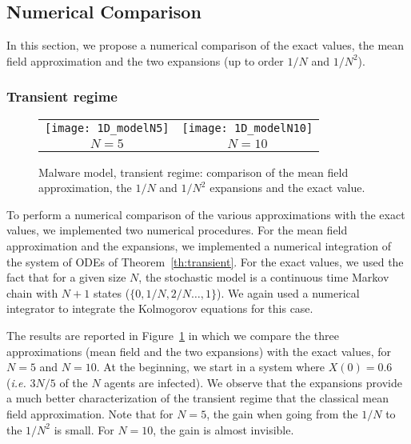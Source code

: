 \documentclass[sigconf]{acmart}
\begin{document}
\subsection{Numerical Comparison}

In this section, we propose a numerical comparison of the exact
values, the mean field approximation and the two expansions (up to
order $1/N$ and $1/N^2$).

\subsubsection{Transient regime}

\begin{figure}[t]
  \centering
  \begin{tabular}{@{}cc@{}}
    \texttt{[image: 1D\_modelN5]}
    &\texttt{[image: 1D\_modelN10]}
    \\
    $N=5$&$N=10$
  \end{tabular}
  
  \caption{Malware model, transient regime: comparison of the mean
    field approximation, the $1/N$ and $1/N^2$ expansions and the
    exact value.}
  \label{fig:SIS-transient1}
\end{figure}

To perform a numerical comparison of the various approximations with
the exact values, we implemented two numerical procedures. For the
mean field approximation and the expansions, we implemented a
numerical integration of the system of ODEs of
Theorem~\ref{th:transient}.  For the exact values, we used the fact
that for a given size $N$, the stochastic model is a continuous time
Markov chain with $N+1$ states ($\{0,1/N,2/N\dots,1\}$). We again used
a numerical integrator to integrate the Kolmogorov equations for this
case.

The results are reported in Figure~\ref{fig:SIS-transient1} in which
we compare the three approximations (mean field and the two
expansions) with the exact values, for $N=5$ and $N=10$. At the
beginning, we start in a system where $X(0)=0.6$ (\emph{i.e.} $3N/5$
of the $N$ agents are infected). We observe that the expansions
provide a much better characterization of the transient regime that
the classical mean field approximation. Note that for $N=5$, the gain
when going from the $1/N$ to the $1/N^2$ is small. For $N=10$, the
gain is almost invisible. 
\end{document}
